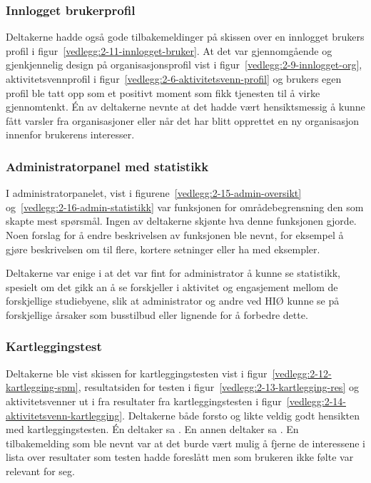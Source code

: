 \subsubsection{Innlogget brukerprofil}

Deltakerne hadde også gode tilbakemeldinger på skissen over en innlogget brukers profil i figur~\ref{vedlegg:2-11-innlogget-bruker}. At det var gjennomgående og gjenkjennelig design på organisasjonsprofil vist i figur~\ref{vedlegg:2-9-innlogget-org}, aktivitetsvennprofil i figur~\ref{vedlegg:2-6-aktivitetsvenn-profil} og brukers egen profil ble tatt opp som et positivt moment som fikk tjenesten til å virke gjennomtenkt. Én av deltakerne nevnte at det hadde vært hensiktsmessig å kunne fått varsler fra organisasjoner eller når det har blitt opprettet en ny organisasjon innenfor brukerens interesser.


\subsubsection{Administratorpanel med statistikk}

I administratorpanelet, vist i figurene~\ref{vedlegg:2-15-admin-oversikt} og~\ref{vedlegg:2-16-admin-statistikk} var funksjonen for områdebegrensning den som skapte mest spørsmål. Ingen av deltakerne skjønte hva denne funksjonen gjorde. Noen forslag for å endre beskrivelsen av funksjonen ble nevnt, for eksempel å gjøre beskrivelsen om til flere, kortere setninger eller ha med eksempler.

Deltakerne var enige i at det var fint for administrator å kunne se statistikk, spesielt om det gikk an å se forskjeller i aktivitet og engasjement mellom de forskjellige studiebyene, slik at administrator og andre ved HIØ kunne se på forskjellige årsaker som busstilbud eller lignende for å forbedre dette.


\subsubsection{Kartleggingstest}

Deltakerne ble vist skissen for kartleggingstesten vist i figur~\ref{vedlegg:2-12-kartlegging-spm}, resultatsiden for testen i figur~\ref{vedlegg:2-13-kartlegging-res} og aktivitetsvenner ut i fra resultater fra kartleggingstesten i figur~\ref{vedlegg:2-14-aktivitetsvenn-kartlegging}. Deltakerne både forsto og likte veldig godt hensikten med kartleggingstesten. Én deltaker sa . En annen deltaker sa . En tilbakemelding som ble nevnt var at det burde vært mulig å fjerne de interessene i lista over resultater som testen hadde foreslått men som brukeren ikke følte var relevant for seg.


